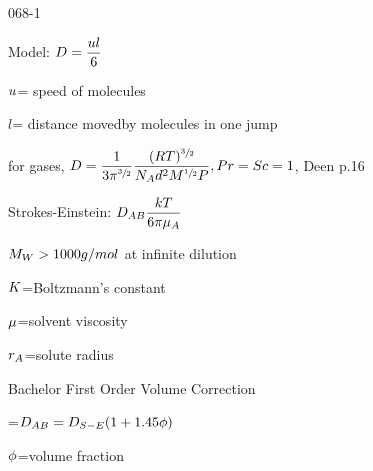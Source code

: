 \begin{mitframe}{068-1}
    
	\begin{listone}
    	\item Model: $\elecdisplace=\dfrac{\forcepot{l}}{6}$
            \begin{listtwo}
            	\item $\forcepot$= speed of molecules
                \item $l$= distance movedby molecules in one jump
                \item for gases, $\elecdisplace=\dfrac{1}{3\pi^{\sfrac{3}{2}}}\dfrac{(\gasconst\Temp)^{\sfrac{3}{2}}}{\nummoles_{\helmholtz}d^2{M}^{\sfrac{1}{2}}\p},\prandtl=\schmidt=1$, Deen p.16
            \end{listtwo}
\item Strokes-Einstein: $\elecdisplace_{\helmholtz\exergy}\dfrac{\thermcond\Temp}{6\pi\chempot_{\helmholtz}}$
		\begin{listtwo}
        		\item $\mw>1000g/mol$ at infinite dilution
                \item $\dilfac$=Boltzmann's constant
                 \item $\chempot$=solvent viscosity
                \item $\pos_{\helmholtz}$=solute radius
                \item Bachelor First Order Volume Correction
                		\begin{listthree}
                        	\item =$\elecdisplace_{\helmholtz\exergy}=\elecdisplace_{\entropy-\energy}(1+1.45\eleccoeff)$
                            \item $\eleccoeff$=volume fraction
                        \end{listthree}
        \end{listtwo}
\end{listone}
\end{mitframe}